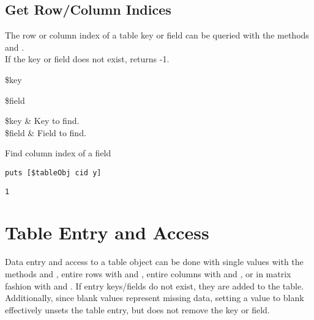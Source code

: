 \documentclass{article}
\begin{document}
\subsection{Get Row/Column Indices}
The row or column index of a table key or field can be queried with the methods  and . \\
If the key or field does not exist, returns -1.

\begin{syntax}
 \$key 
\end{syntax}
\begin{syntax}
 \$field 
\end{syntax}
\begin{args}
\$key & Key to find. \\
\$field & Field to find.
\end{args}

\begin{example}{Find column index of a field}
\begin{lstlisting}
puts [$tableObj cid y]
\end{lstlisting}
\tcblower
\begin{lstlisting}
1
\end{lstlisting}
\end{example}

\clearpage
\section{Table Entry and Access}
Data entry and access to a table object can be done with single values with the methods  and , entire rows with  and , entire columns with  and , or in matrix fashion with  and . 
If entry keys/fields do not exist, they are added to the table. 
Additionally, since blank values represent missing data, setting a value to blank effectively unsets the table entry, but does not remove the key or field. 
\end{document}
